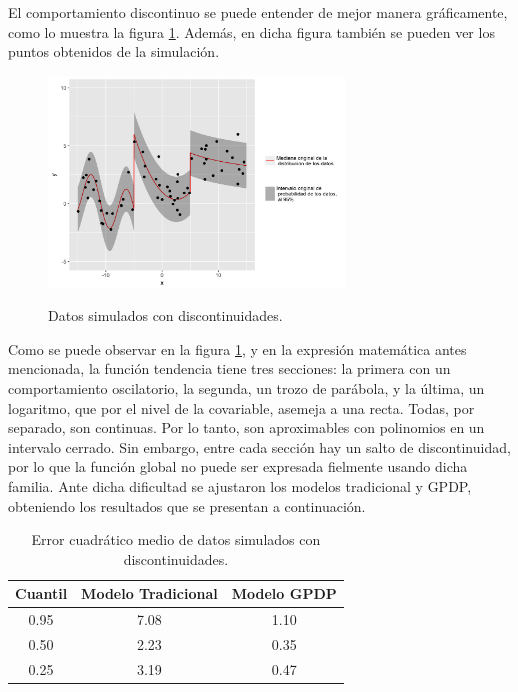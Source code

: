 El comportamiento discontinuo se puede entender de mejor manera gr\'aficamente, como lo muestra la figura \ref{sample_discontinuous}. Adem\'as, en dicha figura tambi\'en se pueden ver los puntos obtenidos de la simulaci\'on.

\begin{figure}[H]
	\centering
	\caption{Datos simulados con discontinuidades.}
	\includegraphics[width=0.7\textwidth]{Figures/Simulation/discontinuous/sample.png}
	\label{sample_discontinuous}
\end{figure}

Como se puede observar en la figura \ref{sample_discontinuous}, y en la expresi\'on matem\'atica antes mencionada, la funci\'on tendencia tiene tres secciones: la primera con un comportamiento oscilatorio, la segunda, un trozo de par\'abola, y la \'ultima, un logaritmo, que por el nivel de la covariable, asemeja a una recta. Todas, por separado, son continuas. Por lo tanto, son aproximables con polinomios en un intervalo cerrado. Sin embargo, entre cada secci\'on hay un salto de discontinuidad, por lo que la funci\'on global no puede ser expresada fielmente usando dicha familia. Ante dicha dificultad se ajustaron los modelos tradicional y GPDP, obteniendo los resultados que se presentan a continuaci\'on. 

\begin{table}[H]
\centering
\caption{Error cuadrático medio de datos simulados con discontinuidades.} 
\begin{tabular}{ccc}
  \hline
Cuantil & Modelo Tradicional & Modelo GPDP \\ 
  \hline
0.95 & 7.08 & 1.10 \\ 
  0.50 & 2.23 & 0.35 \\ 
  0.25 & 3.19 & 0.47 \\ 
   \hline
\end{tabular}
\label{mse_discontinuous}
\end{table}

